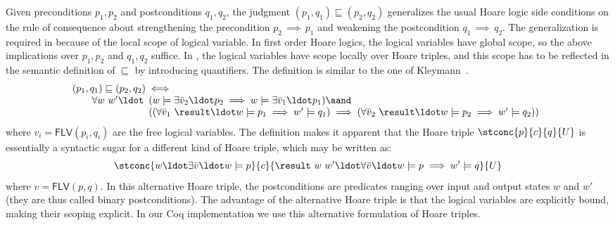 Given preconditions $p_1, p_2$ and postconditions $q_1, q_2$, the
judgment $(p_1, q_1) \sqsubseteq (p_2, q_2)$ generalizes the usual
Hoare logic side conditions on the rule of consequence about
strengthening the precondition $p_2\,{\implies}\,p_1$ and weakening
the postcondition $q_1\,{\implies}\,q_2$.  The generalization is
required in \SCST because of the local scope of logical variable. In
first order Hoare logics, the logical variables have global scope, so
the above implications over $p_1, p_2$ and $q_1, q_2$ suffice. In
\SCST, the logical variables have scope locally over Hoare triples,
and this scope has to be reflected in the semantic definition of
$\sqsubseteq$ by introducing quantifiers. The definition is similar to
the one of Kleymann~\cite{Kleymann:FAC99}.
%
{\small
\[
\begin{array}{l}
(p_1, q_1) \sqsubseteq (p_2, q_2) \iff \hbox{}\\
\qquad \forall w\ w'\ldot \begin{array}[t]{l}
(w \models \exists \bar{v}_2\ldot p_2 \implies w \models \exists \bar{v}_1\ldot p_1) \aand \hbox{}\\
((\forall \bar{v}_1\ \result\ldot w \models p_1 \implies w' \models q_1) \implies (\forall \bar{v}_2\ \result\ldot w \models p_2 \implies w' \models q_2))
\end{array}
\end{array}
\]}
where $v_i = \mathsf{FLV}(p_i, q_i)$ are the free logical variables.
%
The definition makes it apparent that the Hoare triple
$\stconc{p}{c}{q}{U}$ is essentially a syntactic sugar for a different
kind of Hoare triple, which may be written as:
{\small
\[
\stconc{w\ldot\exists \bar{v}\ldot w \models p}{c}{\result\ w\ w'\ldot \forall \bar{v}\ldot w \models p \implies w' \models q}{U}
\]}
where $v = \mathsf{FLV}(p,q)$. In this alternative Hoare triple, the
postconditions are predicates ranging over input and output states $w$
and $w'$ (they are thus called binary postconditions). The advantage
of the alternative Hoare triple is that the logical variables are
explicitly bound, making their scoping explicit. In our Coq
implementation we use this alternative formulation of Hoare triples.

